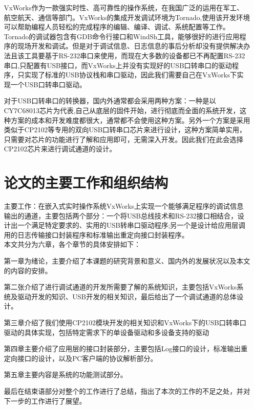	VxWorks作为一款强实时性、高可靠性的操作系统，在我国广泛的运用在军工、航空航天、通信等部门\cite{陈洋2007VxWorks}\cite{张鹏2007基于}。VxWorks的集成开发调试环境为Tornado,使用该开发环境可以帮助编程人员轻松的完成程序的编辑、编译、调试、系统配置等工作\cite{嵌入式实时操作系统VxWorks及其开发环境Tornado}\cite{Tronado}。Tornado的调试器包含有GDB命令行接口和WindSh工具，能够很好的进行应用程序的现场开发和调试。但是对于调试信息、日志信息的事后分析却没有提供解决办法且该工具要基于RS-232串口来使用，而现在大多数的设备都已不再配置RS-232串口,只配置有USB接口，而VxWorks上并没有实现好的USB口转串口的驱动程序，只实现了标准的USB协议栈和串口驱动，因此我们需要自己在VxWorks下实现一个USB口转串口驱动。
	
	对于USB口转串口的转换器，国内外通常都会采用两种方案：一种是以CY7C68013芯片为代表,自己从底层的固件开始，进行彻底而全面的系统开发，这种方案的成本和开发难度都很大，通常都不会使用这种方案。另外一个方案是采用类似于CP2102等专用的双向USB口转串口芯片来进行设计，这种方案简单实用，只需要对芯片的功能进行了解和应用即可，无需深入开发\cite{Yao2009Design}\cite{Zhou2002The}。因此我们在此会选择CP2102芯片来进行调试通道的设计。	
	
	

\section{论文的主要工作和组织结构}	
	主要工作：在嵌入式实时操作系统VxWorks上实现一个能够满足程序的调试信息输出的通道，主要包括两个部分：一个将USB总线技术和RS-232接口相结合，设计出一个满足特定要求的、实用的USB转串口驱动程序;另一个是设计给应用层调用的日志传输接口封装程序和标准输出重定向接口封装程序。\\
 本文共分为六章，各个章节的具体安排如下：
 
 第一章为绪论，主要介绍了本课题的研究背景和意义、国内外的发展状况以及本文的内容的安排。
 
 第二张介绍了进行调试通道的开发所需要了解的系统知识，主要包括VxWorks系统及驱动开发的知识、USB开发的相关知识，最后给出了一个调试通道的总体设计。
 
 第三章介绍了我们使用CP2102模块开发的相关知识和VxWorks下的USB口转串口驱动的具体实现，包括特定需求下的单设备驱动和多设备支持的驱动
 
 第四章主要介绍了应用层的接口封装部分，主要包括Log接口的设计，标准输出重定向接口的设计，以及PC客户端的协议解析部分。
 
 第五章主要内容是系统的功能测试部分。
 
 最后在结束语部分对整个的工作进行了总结，指出了本次的工作的不足之处，并对下一步的工作进行了展望。 

\